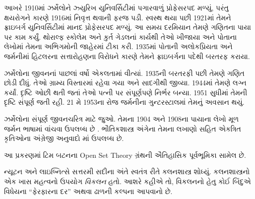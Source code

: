 આખરે 1910માં ઝર્મેલોને
ઝ્યુરિખ યુનિવર્સિટીમાં
પગારવાળું પ્રોફેસરપદ
મળ્યું, પરંતુ ક્ષયરોગને
કારણે 1916માં નિવૃત્ત
થવાની ફરજ પડી.
સ્વસ્થ થયા પછી 1921માં
તેમને ફ્રાઇબર્ગ
યુનિવર્સિટીમાં માનદ
પ્રોફેસરપદ મળ્યું.
આ સમય દરમિયાન તેમણે
ગણિતના પાયા પર કામ
કર્યું. થોરાલ્ફ સ્કોલેમ
અને કુર્ત ગેડલનાં
કાર્યથી તેઓ ખીજાયા
અને પોતાના લેખોમાં
તેમના અભિગમોની
જાહેરમાં ટીકા કરી.
1935માં પોતાની
અલોકપ્રિયતા અને
જર્મનીમાં હિટલરના
સત્તારોહણના વિરોધને
કારણે તેમને ફ્રાઇબર્ગના
પદેથી બરતરફ કરાયા.
 
ઝર્મેલોના જીવનનાં
પાછલાં વર્ષો એકલતામાં
વીત્યાં. 1935ની
બરતરફી પછી તેમણે
ગણિત છોડી દીધું.
તેઓ ગ્રામ્ય વિસ્તારમાં
રહેવા ગયા અને સાદગીથી
જીવ્યા. 1944માં તેમણે
લગ્ન કર્યાં. દૃષ્ટિ
ઓછી થતી જતાં તેઓ
પત્ની પર સંપૂર્ણપણે
નિર્ભર બન્યા. 1951
સુધીમાં તેમની દૃષ્ટિ
સંપૂર્ણ જતી રહી.
21 મે 1953ના રોજ
જર્મનીના ગુન્ટરસ્ટાલમાં
તેમનું અવસાન થયું.

\begin{reading}
ઝર્મેલોના સંપૂર્ણ
જીવનચરિત્ર માટે
\citet{Ebbinghaus2015}
જુઓ. તેમના 1904
અને 1908ના પાયાના
લેખો મૂળ જર્મન
ભાષામાં વાંચવા
ઉપલબ્ધ છે
\citep{Zermelo1904,Zermelo1908}.
ભૌતિકશાસ્ત્ર અંગેના
તેમના લખાણો સહિત
એકત્રિત કૃતિઓના
અંગ્રેજી અનુવાદો
\citep{Ebbinghaus2010,Ebbinghaus2013}માં
ઉપલબ્ધ છે.
\end{reading}
\endgroup


\OLEndChapterHook
\endgroup


\begingroup
\makeatletter{}\makeatother

\label{guunit:OLP-0633}


\begin{editorial}
આ પ્રકરણમાં ટિમ બટનના Open Set Theory
ગ્રંથની ઐતિહાસિક પૂર્વભૂમિકા સામેલ છે.
\end{editorial}

\begingroup
\makeatletter{}\makeatother

\label{guunit:OLP-0634}


ન્યૂટન અને લાઇબ્નિત્સે સત્તરમી સદીના અંતે સ્વતંત્ર રીતે
કલનશાસ્ત્ર શોધ્યું. કલનશાસ્ત્રનો એક ખાસ મહત્વનો ઉપયોગ
\emph{વિકલન} હતો. આશરે કહીએ તો, વિકલનનો હેતુ કોઈ
બિંદુએ વિધેયના “ફેરફારના દર” અથવા ઢાળની કલ્પના
આપવાનો છે.

